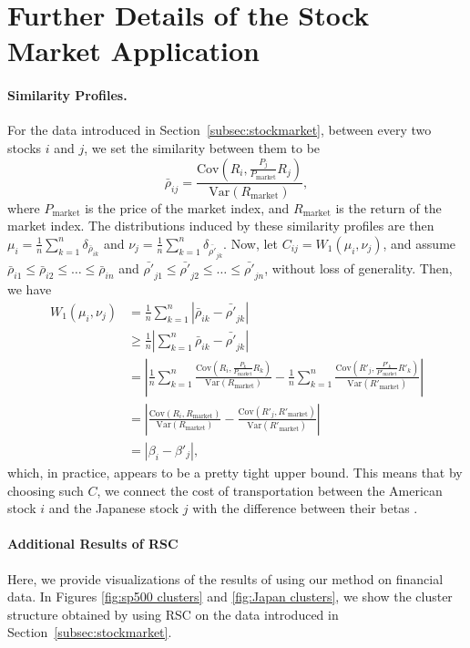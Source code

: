 \documentclass{article}
\theoremstyle{definition}
\begin{document}
\section{Further Details of the Stock Market Application}
\label{appendix:stock market}
\paragraph{Similarity Profiles.}
For the data introduced in Section~\ref{subsec:stockmarket},
between every two stocks $i$ and $j$, we set the similarity between them to be
\[
    \bar{\rho}_{ij} = \frac{\mathrm{Cov}(R_i, \frac{P_j}{P_{\mathrm{market}}}R_j)}{\mathrm{Var}(R_{\mathrm{market}})},
\]
where $P_{\mathrm{market}}$ is the price of the market index, and $R_{\mathrm{market}}$ is the return of the market index. The distributions induced by these similarity profiles are then $\mu_i = \frac{1}{n}\sum_{k=1}^{n}\delta_{\bar{\rho}_{ik}}$ and $\nu_j = \frac{1}{n}\sum_{k=1}^{n}\delta_{\bar{\rho'}_{jk}}$. Now, let $C_{ij} = W_1(\mu_i, \nu_j)$, and assume $\bar{\rho}_{i1} \leq\bar{\rho}_{i2} \leq \dots \leq \bar{\rho}_{in}$ and $\bar{\rho'}_{j1} \leq \bar{\rho'}_{j2} \leq \dots \leq \bar{\rho'}_{jn}$, without loss of generality. Then, we have
\[
    \begin{split}
        W_1(\mu_i, \nu_j) 
        & = \frac{1}{n}\sum_{k=1}^n |\bar{\rho}_{ik} - \bar{\rho'}_{jk}| \\
        & \geq \frac{1}{n}|\sum_{k=1}^n \bar{\rho}_{ik} - \bar{\rho'}_{jk}| \\
        & = |\frac{1}{n}\sum_{k=1}^n\frac{\mathrm{Cov}(R_i, \frac{P_k}{P_{\mathrm{market}}}R_k)}{\mathrm{Var}(R_{\mathrm{market}})} - \frac{1}{n}\sum_{k=1}^n\frac{\mathrm{Cov}(R'_j, \frac{P'_k}{P'_{\mathrm{market}}}R'_k)}{\mathrm{Var}(R'_{\mathrm{market}})}| \\
        & = |\frac{\mathrm{Cov}(R_i, R_{\mathrm{market}})}{\mathrm{Var}(R_{\mathrm{market}})} - \frac{\mathrm{Cov}(R'_j, R'_{\mathrm{market}})}{\mathrm{Var}(R'_{\mathrm{market}})}| \\
        & = |\beta_{i} - \beta'_{j}|,
    \end{split}
\]
which, in practice, appears to be a pretty tight upper bound. This means that by choosing such $C$, we connect the cost of transportation between the American stock $i$ and the Japanese stock $j$ with the difference between their betas \cite{brealey2011principles}.


\paragraph{Additional Results of RSC}
Here, we provide visualizations of the results of using our method on financial data. In Figures \ref{fig:sp500 clusters} and \ref{fig:Japan clusters}, we show the cluster structure obtained by using RSC on the data introduced in Section~\ref{subsec:stockmarket}. 
\end{document}
